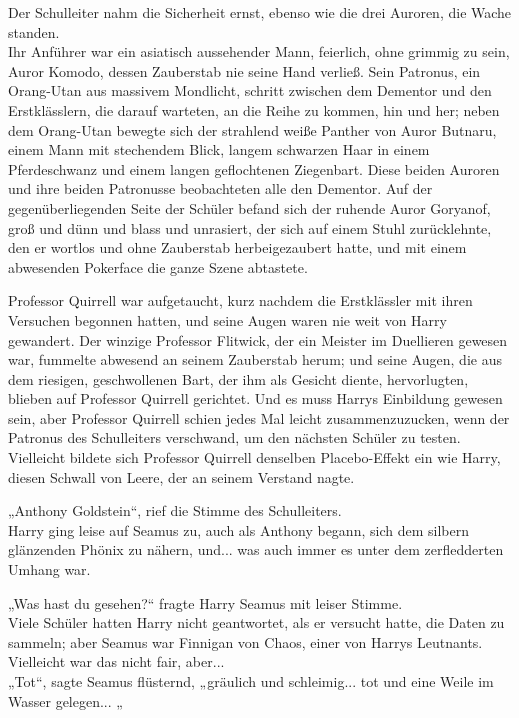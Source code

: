 {Der Schulleiter nahm die Sicherheit ernst, ebenso wie die drei Auroren, die Wache standen.\\ Ihr Anführer war ein asiatisch aussehender Mann, feierlich, ohne grimmig zu sein, Auror Komodo, dessen Zauberstab nie seine Hand verließ. Sein Patronus, ein Orang-Utan aus massivem Mondlicht, schritt zwischen dem Dementor und den Erstklässlern, die darauf warteten, an die Reihe zu kommen, hin und her; neben dem Orang-Utan bewegte sich der strahlend weiße Panther von Auror Butnaru, einem Mann mit stechendem Blick, langem schwarzen Haar in einem Pferdeschwanz und einem langen geflochtenen Ziegenbart. Diese beiden Auroren und ihre beiden Patronusse beobachteten alle den Dementor. Auf der gegenüberliegenden Seite der Schüler befand sich der ruhende Auror Goryanof, groß und dünn und blass und unrasiert, der sich auf einem Stuhl zurücklehnte, den er wortlos und ohne Zauberstab herbeigezaubert hatte, und mit einem abwesenden Pokerface die ganze Szene abtastete.

Professor Quirrell war aufgetaucht, kurz nachdem die Erstklässler mit ihren Versuchen begonnen hatten, und seine Augen waren nie weit von Harry gewandert. Der winzige Professor Flitwick, der ein Meister im Duellieren gewesen war, fummelte abwesend an seinem Zauberstab herum; und seine Augen, die aus dem riesigen, geschwollenen Bart, der ihm als Gesicht diente, hervorlugten, blieben auf Professor Quirrell gerichtet. Und es muss Harrys Einbildung gewesen sein, aber Professor Quirrell schien jedes Mal leicht zusammenzuzucken, wenn der Patronus des Schulleiters verschwand, um den nächsten Schüler zu testen. Vielleicht bildete sich Professor Quirrell denselben Placebo-Effekt ein wie Harry, diesen Schwall von Leere, der an seinem Verstand nagte.

„Anthony Goldstein“, rief die Stimme des Schulleiters.\\ Harry ging leise auf Seamus zu, auch als Anthony begann, sich dem silbern glänzenden Phönix zu nähern, und... was auch immer es unter dem zerfledderten Umhang war.

„Was hast du gesehen?“ fragte Harry Seamus mit leiser Stimme.\\ Viele Schüler hatten Harry nicht geantwortet, als er versucht hatte, die Daten zu sammeln; aber Seamus war Finnigan von Chaos, einer von Harrys Leutnants. Vielleicht war das nicht fair, aber...\\ „Tot“, sagte Seamus flüsternd, „gräulich und schleimig... tot und eine Weile im Wasser gelegen... „

}
